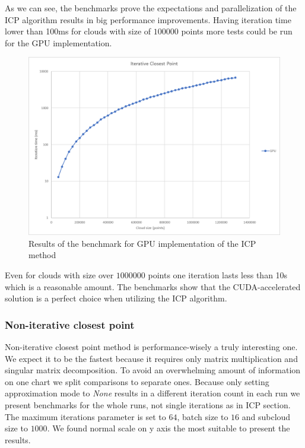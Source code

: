 \documentclass[titlepage]{article}
\begin{document}
As we can see, the benchmarks prove the expectations and parallelization of the ICP algorithm results in big performance improvements. Having iteration time lower than 100ms for clouds with size of $100000$ points more tests could be run for the GPU implementation.

\begin{figure}[H]
\includegraphics[width=\textwidth]{ms-icp-2.png}
\caption{Results of the benchmark for GPU implementation of the ICP method}
\end{figure}

Even for clouds with size over $1000000$ points one iteration lasts less than 10s which is a reasonable amount. The benchmarks show that the CUDA-accelerated solution is a perfect choice when utilizing the ICP algorithm.

\subsubsection{Non-iterative closest point}
Non-iterative closest point method is performance-wisely a truly interesting one. We expect it to be the fastest because it requires only matrix multiplication and singular matrix decomposition. To avoid an overwhelming amount of information on one chart we split comparisons to separate ones. Because only setting approximation mode to \textit{None} results in a different iteration count in each run we present benchmarks for the whole runs, not single iterations as in ICP section. The maximum iterations parameter is set to $64$, batch size to $16$ and subcloud size to $1000$. We found normal scale on y axis the most suitable to present the results.
\end{document}
